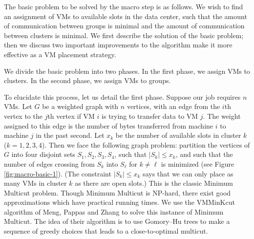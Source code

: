 \documentclass[11pt]{article}
\begin{document}
The basic problem to be solved by the macro step is as follows.  We wish to find an assignment of VMs to available slots in the data center, such that the amount of communication between groups is minimal and the amount of communication between clusters is minimal.  We first describe the solution of the basic problem; then we discuss two important improvements to the algorithm make it more effective as a VM placement strategy.

We divide the basic problem into two phases. In the first phase, we assign VMs to clusters.  In the second phase, we assign VMs to groups.

To elucidate this process, let us detail the first phase.  Suppose our job requires $n$ VMs.  Let $G$ be a weighted graph with $n$ vertices, with an edge from the $i$th vertex to the $j$th vertex if VM $i$ is trying to transfer data to VM $j$.  The weight assigned to this edge is the number of bytes transferred from machine $i$ to machine $j$ in the past second.  Let $x_k$ be the number of available slots in cluster $k$ ($k = 1,2,3,4$).  Then we face the following graph problem: partition the vertices of $G$ into four disjoint sets $S_1,S_2,S_3,S_4$, such that $|S_k| \leq x_k$, and such that the number of edges crossing from $S_k$ into $S_\ell$ for $k \neq \ell$ is minimized (see Figure \ref{fig:macro-basic-1}).  (The constraint $|S_k| \leq x_k$ says that we can only place as many VMs in cluster $k$ as there are open slots.)  This is the classic Minimum Multicut problem.  Though Minimum Multicut is NP-hard, there exist good approximations which have practical running times.  We use the VMMinKcut algorithm of Meng, Pappas and Zhang \cite{Meng} to solve this instance of Minimum Multicut.  The idea of their algorithm is to use Gomory--Hu trees to make a sequence of greedy choices that leads to a close-to-optimal multicut.
\end{document}
